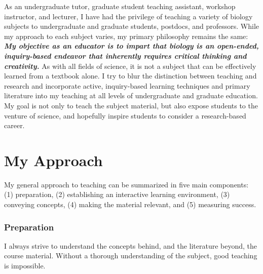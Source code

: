 As an undergraduate tutor, graduate student teaching assistant, workshop
instructor, and lecturer,
I have had the privilege of teaching a variety of biology subjects to
undergraduate and graduate students, postdocs, and professors.
While my approach to each subject varies, my primary philosophy remains the
same:
\textbf{\textit{My objective as an educator is to impart that biology is an
open-ended, inquiry-based endeavor that inherently requires critical thinking
and creativity.}}
As with all fields of science, it is not a subject that can be effectively
learned from a textbook alone.
I try to blur the distinction between teaching and research and incorporate
active, inquiry-based learning techniques and primary literature into my
teaching at all levels of undergraduate and graduate education.
My goal is not only to teach the subject material, but also expose students to
the venture of science, and hopefully inspire students to consider a
research-based career. 

\section*{My Approach}
My general approach to teaching can be summarized in five main components:
(1) preparation,
(2) establishing an interactive learning environment,
(3) conveying concepts,
(4) making the material relevant,
and
(5) measuring success.

\subsubsection*{Preparation}
I always strive to understand the concepts behind, and the literature beyond,
the course material.
Without a thorough understanding of the subject, good teaching is impossible.

